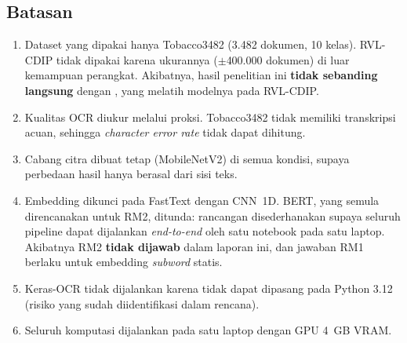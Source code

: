 \subsection{Batasan}\label{sec:batasan}

\begin{enumerate}
  \item Dataset yang dipakai hanya Tobacco3482 (3.482 dokumen, 10 kelas). RVL-CDIP
  \parencite{harley2015} tidak dipakai karena ukurannya ($\pm$400.000 dokumen) di luar
  kemampuan perangkat. Akibatnya, hasil penelitian ini \textbf{tidak sebanding langsung}
  dengan \textcite{kashyap2026}, yang melatih modelnya pada RVL-CDIP.
  \item Kualitas OCR diukur melalui proksi. Tobacco3482 tidak memiliki transkripsi acuan,
  sehingga \textit{character error rate} tidak dapat dihitung.
  \item Cabang citra dibuat tetap (MobileNetV2) di semua kondisi, supaya perbedaan hasil
  hanya berasal dari sisi teks.
  \item Embedding dikunci pada FastText dengan CNN~1D. BERT, yang semula direncanakan untuk
  RM2, ditunda: rancangan disederhanakan supaya seluruh pipeline dapat dijalankan
  \textit{end-to-end} oleh satu notebook pada satu laptop. Akibatnya RM2 \textbf{tidak
  dijawab} dalam laporan ini, dan jawaban RM1 berlaku untuk embedding \textit{subword}
  statis.
  \item Keras-OCR tidak dijalankan karena tidak dapat dipasang pada Python 3.12
  (risiko yang sudah diidentifikasi dalam rencana).
  \item Seluruh komputasi dijalankan pada satu laptop dengan GPU 4~GB VRAM.
\end{enumerate}
